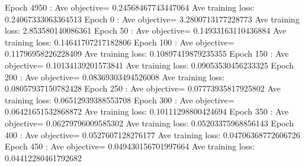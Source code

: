 \documentclass{article}
\theoremstyle{plain}
\theoremstyle{definition}
\begin{document}
\begin{enumerate}
Epoch  4950 : Ave objective= 0.24568467743447064  Ave training loss:  0.24067333063364513
Epoch  0 : Ave objective= 3.2800713177228773  Ave training loss:  2.853580140086361
Epoch  50 : Ave objective= 0.14933163110436884  Ave training loss:  0.14641707217182806
Epoch  100 : Ave objective= 0.11796958226228409  Ave training loss:  0.10897419879235355
Epoch  150 : Ave objective= 0.10134139201573841  Ave training loss:  0.09053530456233325
Epoch  200 : Ave objective= 0.08369303494526008  Ave training loss:  0.08057937150782428
Epoch  250 : Ave objective= 0.07773935817925802  Ave training loss:  0.06512939388553708
Epoch  300 : Ave objective= 0.06421651532868872  Ave training loss:  0.10111298800424694
Epoch  350 : Ave objective= 0.06279796009585302  Ave training loss:  0.05203375968856143
Epoch  400 : Ave objective= 0.0527607128276177  Ave training loss:  0.04706368772606726
Epoch  450 : Ave objective= 0.049430156701997664  Ave training loss:  0.04412280461792682
\setcounter{saveenum}{\value{enumi}}
\end{enumerate}
\end{document}
